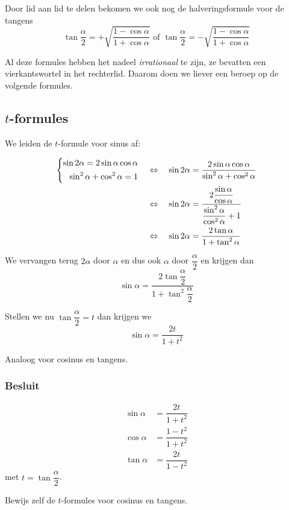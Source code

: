 \documentclass[twoside,a4paper,12pt]{article}
\begin{document}
Door lid aan lid te delen bekomen we ook nog de halveringsformule voor de tangens
$$\tan\dfrac{\alpha}{2} = +\sqrt{\dfrac{1-\cos\alpha}{1+\cos\alpha}} \mbox{ of } \tan\dfrac{\alpha}{2} = -\sqrt{\dfrac{1-\cos\alpha}{1+\cos\alpha}}$$

Al deze formules hebben het nadeel {\em irrationaal} te zijn, ze bevatten een vierkantswortel in het rechterlid.
Daarom doen we liever een beroep op de volgende formules.

\subsection{$t$-formules}

We leiden de $t$-formule voor sinus af:

\begin{align*}
  \left\{\begin{aligned}\sin 2\alpha = 2\sin\alpha\cos\alpha\\\sin^2\alpha + \cos^2\alpha = 1\end{aligned}\right. \quad
  &\Leftrightarrow\quad \sin 2\alpha = \dfrac{2\sin\alpha\cos\alpha}{\sin^2\alpha + \cos^2\alpha}\\
  &\Leftrightarrow\quad \sin 2\alpha = \dfrac{2\dfrac{\sin\alpha}{\cos\alpha}}{\dfrac{\sin^2\alpha}{\cos^2\alpha}+1}\\
  &\Leftrightarrow\quad \sin 2\alpha = \dfrac{2\tan\alpha}{1+\tan^2\alpha}
\end{align*}

We vervangen terug $2\alpha$ door $\alpha$ en dus ook $\alpha$ door $\dfrac{\alpha}{2}$ en krijgen dan
$$\sin\alpha = \dfrac{2\tan\dfrac{\alpha}{2}}{1+\tan^2\dfrac{\alpha}{2}}$$

Stellen we nu $\tan\dfrac{\alpha}{2}=t$ dan krijgen we
$$\sin\alpha = \dfrac{2t}{1+t^2}$$

Analoog voor cosinus en tangens.

\subsubsection*{Besluit}
\begin{align*}
  \sin\alpha &= \dfrac{2t}{1+t^2}\\
  \cos\alpha &= \dfrac{1-t^2}{1+t^2}\\
  \tan\alpha &= \dfrac{2t}{1-t^2}
\end{align*}
met $t=\tan \dfrac{\alpha}{2}$.

\begin{oefening}
Bewijs zelf de $t$-formules voor cosinus en tangens.
\end{oefening}
\end{document}
